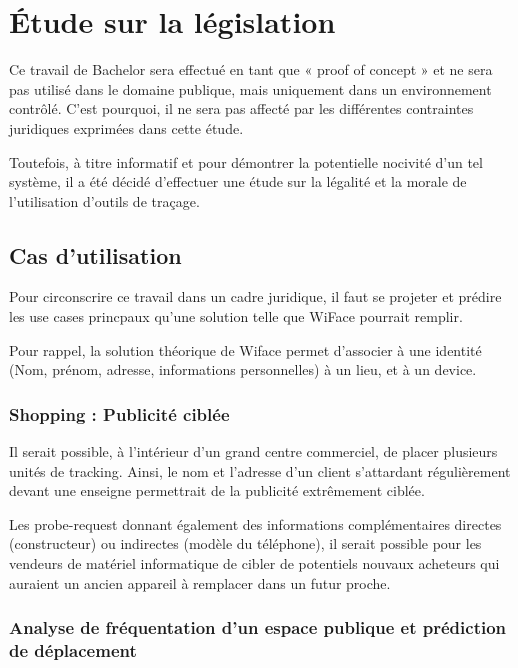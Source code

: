 \chapter{Étude sur la législation}
\label{ch:etudelegislation}

Ce travail de Bachelor sera effectué en tant que « proof of concept » et ne sera pas utilisé dans le domaine publique,
mais uniquement dans un environnement contrôlé. C’est pourquoi, il ne sera pas affecté par les différentes
contraintes juridiques exprimées dans cette étude.

Toutefois, à titre informatif et pour démontrer la potentielle nocivité d’un tel système, il a été décidé d’effectuer
une étude sur la légalité et la morale de l’utilisation d’outils de traçage.

\section{Cas d’utilisation}
Pour circonscrire ce travail dans un cadre juridique, il faut se projeter et prédire les use cases princpaux qu’une
solution telle que WiFace pourrait remplir.

Pour rappel, la solution théorique de Wiface permet d’associer à une identité (Nom, prénom, adresse, informations
personnelles) à un lieu, et à un device.

\subsection{Shopping : Publicité ciblée}

Il serait possible, à l’intérieur d’un grand centre commerciel, de placer plusieurs unités de tracking. Ainsi, le nom et
l’adresse d’un client s’attardant régulièrement devant une enseigne permettrait de la publicité extrêmement ciblée.

Les probe-request donnant également des informations complémentaires directes (constructeur) ou indirectes
(modèle du téléphone), il serait possible pour les vendeurs de matériel informatique de cibler de potentiels nouvaux
acheteurs qui auraient un ancien appareil à remplacer dans un futur proche.

\subsection{Analyse de fréquentation d’un espace publique et prédiction de déplacement}

